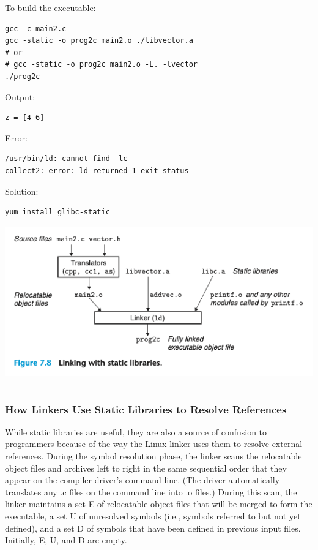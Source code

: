 \documentclass[11pt]{article}
\begin{document}
\begin{enumerate}
To build the executable:\\
\begin{verbatim}
gcc -c main2.c
gcc -static -o prog2c main2.o ./libvector.a
# or
# gcc -static -o prog2c main2.o -L. -lvector
./prog2c
\end{verbatim}
Output:\\
\begin{verbatim}
z = [4 6]
\end{verbatim}

Error:\\
\begin{verbatim}
/usr/bin/ld: cannot find -lc
collect2: error: ld returned 1 exit status
\end{verbatim}
Solution:\\
\begin{verbatim}
yum install glibc-static
\end{verbatim}

\begin{center}
\includegraphics[width=.9\linewidth]{pics/figure7.8-linking-with-static-libraries.png}
\end{center}

\noindent\rule{\textwidth}{0.5pt}
\end{enumerate}

\subsubsection{How Linkers Use Static Libraries to Resolve References}
\label{sec:org00b48e1}
While static libraries are useful, they are also a source of confusion to programmers because of the way the Linux linker uses them to resolve external references. During the symbol resolution phase, the linker scans the relocatable object files and archives left to right in the same sequential order that they appear on the compiler driver’s command line. (The driver automatically translates any .c files on the command line into .o files.) During this scan, the linker maintains a set E of relocatable object files that will be merged to form the executable, a set U of unresolved symbols (i.e., symbols referred to but not yet defined), and a set D of symbols that have been defined in previous input files. Initially, E, U, and D are empty.\\
\end{document}
